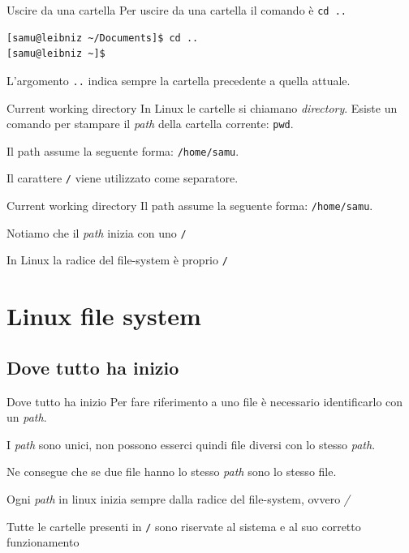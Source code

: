 \documentclass{beamer}
\begin{document}
\begin{frame}[fragile]{Uscire da una cartella}
  Per uscire da una cartella il comando è \texttt{cd ..}\bigskip

    \begin{lstlisting}
[samu@leibniz ~/Documents]$ cd ..
[samu@leibniz ~]$
    \end{lstlisting}

  L'argomento \texttt{..} indica sempre la cartella precedente a quella attuale.
\end{frame}

\begin{frame}{Current working directory}
  In Linux le cartelle si chiamano \textit{directory}. Esiste un comando per
  stampare il \textit{path} della cartella corrente: \texttt{pwd}.\bigskip

  Il path assume la seguente forma: \texttt{/home/samu}.\bigskip

  Il carattere \texttt{/} viene utilizzato come separatore.
\end{frame}

\begin{frame}{Current working directory}
  Il path assume la seguente forma: \texttt{/home/samu}.\bigskip

  Notiamo che il \textit{path} inizia con uno \texttt{/}\bigskip

  In Linux la radice del file-system è proprio \texttt{/}
\end{frame}

\section{Linux file system}

\subsection{Dove tutto ha inizio}
\begin{frame}{Dove tutto ha inizio}
  Per fare riferimento a uno file è necessario identificarlo con un 
  \textit{path}. \bigskip

  I \textit{path} sono unici, non possono esserci quindi file diversi con lo 
  stesso \textit{path}. \bigskip

  Ne consegue che se due file hanno lo stesso \textit{path} sono lo stesso file.
  \bigskip

  Ogni \textit{path} in linux inizia sempre dalla radice del file-system, ovvero
  \textit{/}\bigskip

  Tutte le cartelle presenti in \texttt{/} sono riservate al sistema e al suo
  corretto funzionamento
\end{frame}
\end{document}
